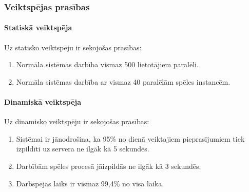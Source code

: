 \subsubsection{Veiktspējas prasības}

\paragraph{Statiskā veiktspēja}
    Uz statisko veiktspēju ir sekojošas prasības:

        \begin{enumerate}
            \item Normāla sistēmas darbība vismaz 500 lietotājiem paralēli.
            \item Normāla sistēmas darbība ar vismaz 40 paralēlām spēles instancēm.
        \end{enumerate}
\paragraph{Dinamiskā veiktspēja}
    Uz dinamisko veiktspēju ir sekojošas prasības:

        \begin{enumerate}
            \item Sistēmai ir jānodrošina, ka 95\% no dienā veiktajiem pieprasījumiem tiek izpildīti uz servera ne ilgāk kā 5 sekundēs.
            \item Darbībām spēles procesā jāizpildās ne ilgāk kā 3 sekundēs.
            \item Darbspējas laiks ir vismaz 99,4\% no visa laika.
        \end{enumerate}

